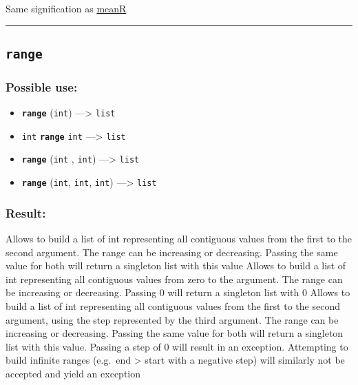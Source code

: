 \documentclass[]{book}
\providecommand{\tightlist}{%
  \setlength{\itemsep}{0pt}\setlength{\parskip}{0pt}}
\theoremstyle{definition}
\theoremstyle{definition}
\theoremstyle{definition}
\theoremstyle{remark}
\begin{document}
Same signification as \href{OperatorsIM\#meanR}{meanR}

\begin{center}\rule{0.5\linewidth}{\linethickness}\end{center}

\subsection{\texorpdfstring{\texttt{range}}{range}}\label{range}

\subsubsection{Possible use:}\label{possible-use-427}

\begin{itemize}
\tightlist
\item
  \textbf{\texttt{range}} (\texttt{int}) ---\textgreater{} \texttt{list}
\item
  \texttt{int} \textbf{\texttt{range}} \texttt{int} ---\textgreater{}
  \texttt{list}
\item
  \textbf{\texttt{range}} (\texttt{int} , \texttt{int})
  ---\textgreater{} \texttt{list}
\item
  \textbf{\texttt{range}} (\texttt{int}, \texttt{int}, \texttt{int})
  ---\textgreater{} \texttt{list}
\end{itemize}

\subsubsection{Result:}\label{result-413}

Allows to build a list of int representing all contiguous values from
the first to the second argument. The range can be increasing or
decreasing. Passing the same value for both will return a singleton list
with this value Allows to build a list of int representing all
contiguous values from zero to the argument. The range can be increasing
or decreasing. Passing 0 will return a singleton list with 0 Allows to
build a list of int representing all contiguous values from the first to
the second argument, using the step represented by the third argument.
The range can be increasing or decreasing. Passing the same value for
both will return a singleton list with this value. Passing a step of 0
will result in an exception. Attempting to build infinite ranges
(e.g.~end \textgreater{} start with a negative step) will similarly not
be accepted and yield an exception
\end{document}
